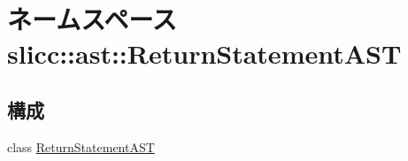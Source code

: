 \hypertarget{namespaceslicc_1_1ast_1_1ReturnStatementAST}{
\section{ネームスペース slicc::ast::ReturnStatementAST}
\label{namespaceslicc_1_1ast_1_1ReturnStatementAST}
}
\subsection*{構成}
\begin{DoxyCompactItemize}
\item 
class \hyperlink{classslicc_1_1ast_1_1ReturnStatementAST_1_1ReturnStatementAST}{ReturnStatementAST}
\end{DoxyCompactItemize}
